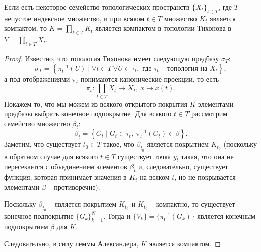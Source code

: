 \begin{theorem}[Тихонов]
    Если есть некоторое семейство топологических пространств $\{X_t\}_{t \in T}$, где $T$ -- непустое индексное множество,
    и при всяком $t \in T$ множество $K_t$ является компактом, то $K = \prod_{t \in T} K_t$ является компактом в топологии Тихонова в $Y = \prod_{t \in T} X_t$.
\end{theorem}
\begin{proof}
    Известно, что топология Тихонова имеет следующую предбазу $\sigma_T\colon$
    \[
        \sigma_T = \left\{\pi^{-1}_t(U) \mid \forall t \in T \ \forall U \in \tau_t, \text{ где }\tau_t \text{ -- топология на }X_t\right\},
    \]
    а под отображениями $\pi_t$ понимаются канонические проекции, то есть
    \[
        \pi_t\colon \prod_{t \in T} X_t \to X_t, \ x \mapsto x(t).
    \]
    Покажем то, что мы можем из всякого открытого покрытия $K$ элементами предбазы выбрать конечное подпокрытие.
    Для всякого $t \in T$ рассмотрим семейство множество $\beta_t\colon$
    \[
        \beta_t = \left\{G_t \mid G_t \in \tau_t, \ \pi^{-1}_t(G_t) \in \beta\right\}.
    \]
    Заметим, что существует $t_0 \in T$ такое, что $\beta_{t_0}$ является покрытием $K_{t_0}$ (поскольку в обратном случае для всякого $t \in T$ существует точка $y_t$ такая, что она не пересекается с объединением элементов $\beta_t$ и, следовательно, существует функция, которая принимает значения в $K_t$ на всяком $t$, но не покрывается элементами $\beta$ -- противоречие).

    Поскольку $\beta_{t_0}$ -- является покрытием $K_{t_0}$ и $K_{t_0}$ -- компактно, то существует конечное подпокрытие $\{G_k\}_{k = 1}^{N}$.
    Тогда и $\{V_k\} = \{\pi^{-1}_t(G_k)\}$ является конечным подпокрытием $\beta$ для $K$.

    Следовательно, в силу леммы Александера, $K$ является компактом.
\end{proof}